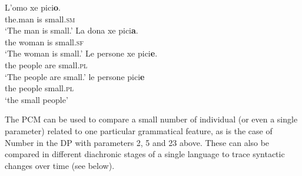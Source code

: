 \documentclass[output=paper,colorlinks,citecolor=brown]{langscibook}
\begin{document}
\ea
\ea 
\settowidth{}
\gll L'omo xe pici\textbf{o}. \\   
the.man is small.\textsc{sm}\\ 
\glt `The man is small.'
\ex 
\gll La dona xe pici\textbf{a}. \\
the woman is small.\textsc{sf}\\ 
\glt `The woman is small.'
\ex 
\gll Le persone xe pici\textbf{e}. \\
the people are small.\textsc{pl}\\ \jambox{[pl. predicative]}
\glt `The people are small.'
\ex 
\gll le persone pici\textbf{e} \\
the people small.\textsc{pl}\\ \jambox{[pl. attributive]}
\glt `the small people'
\z
\label{ex:P23+bisiaco}
\z

\noindent The PCM can be used to compare a small number of individual  (or even a single parameter) related to one particular grammatical feature, as is the case of Number in the DP with parameters 2, 5 and 23 above. These can also be compared in different diachronic stages of a single language to trace syntactic changes over time (see  below). 
\end{document}
